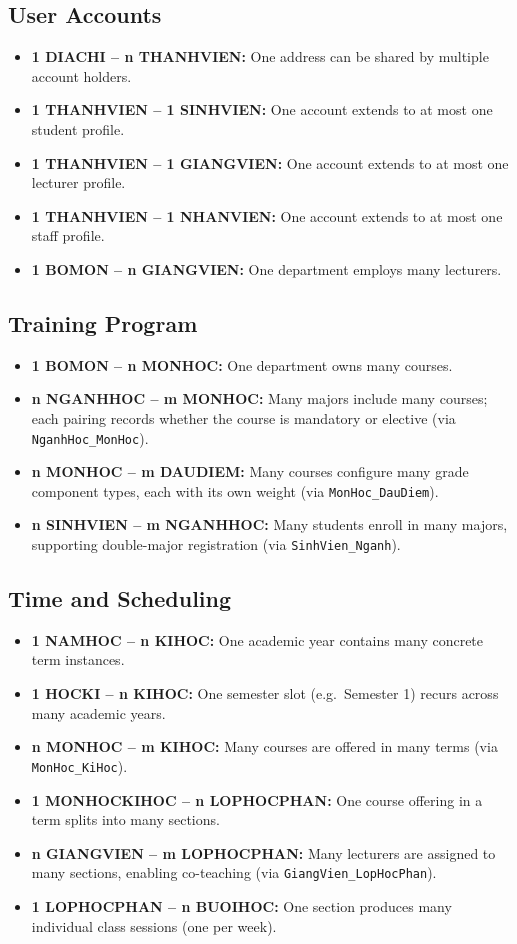 \documentclass[12pt,a4paper]{report}
\begin{document}
\subsection*{User Accounts}
\begin{itemize}
  \item \textbf{1 DIACHI -- n THANHVIEN:} One address can be shared by multiple account holders.
  \item \textbf{1 THANHVIEN -- 1 SINHVIEN:} One account extends to at most one student profile.
  \item \textbf{1 THANHVIEN -- 1 GIANGVIEN:} One account extends to at most one lecturer profile.
  \item \textbf{1 THANHVIEN -- 1 NHANVIEN:} One account extends to at most one staff profile.
  \item \textbf{1 BOMON -- n GIANGVIEN:} One department employs many lecturers.
\end{itemize}

\subsection*{Training Program}
\begin{itemize}
  \item \textbf{1 BOMON -- n MONHOC:} One department owns many courses.
  \item \textbf{n NGANHHOC -- m MONHOC:} Many majors include many courses; each pairing records whether the course is mandatory or elective (via \texttt{NganhHoc\_MonHoc}).
  \item \textbf{n MONHOC -- m DAUDIEM:} Many courses configure many grade component types, each with its own weight (via \texttt{MonHoc\_DauDiem}).
  \item \textbf{n SINHVIEN -- m NGANHHOC:} Many students enroll in many majors, supporting double-major registration (via \texttt{SinhVien\_Nganh}).
\end{itemize}

\subsection*{Time and Scheduling}
\begin{itemize}
  \item \textbf{1 NAMHOC -- n KIHOC:} One academic year contains many concrete term instances.
  \item \textbf{1 HOCKI -- n KIHOC:} One semester slot (e.g.\ Semester 1) recurs across many academic years.
  \item \textbf{n MONHOC -- m KIHOC:} Many courses are offered in many terms (via \texttt{MonHoc\_KiHoc}).
  \item \textbf{1 MONHOCKIHOC -- n LOPHOCPHAN:} One course offering in a term splits into many sections.
  \item \textbf{n GIANGVIEN -- m LOPHOCPHAN:} Many lecturers are assigned to many sections, enabling co-teaching (via \texttt{GiangVien\_LopHocPhan}).
  \item \textbf{1 LOPHOCPHAN -- n BUOIHOC:} One section produces many individual class sessions (one per week).
\end{itemize}
\end{document}
